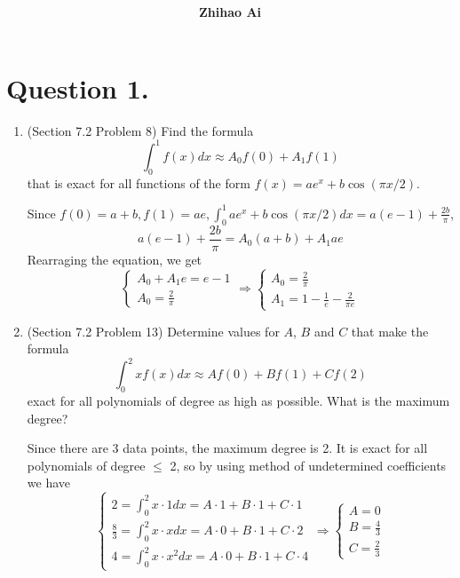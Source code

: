 \documentclass[10pt]{report}
\title{
	\vspace{2in}
	\textmd{\textbf{\hwCourse\\\hwTitle}}\\
	\vspace{0.3in}\large{\textit{\hmwkClassInstructor}}
	\vspace{3in}
}
\author{\textbf{Zhihao Ai}}
\date{}
\newcommand{\dintt}[4] {\int_{#1}^{#2} #3 d#4}
\begin{document}
\maketitle

\section*{Question 1.}
\begin{enumerate}
	\item 
	(Section 7.2 Problem 8) Find the formula
	\[
	\dintt{0}{1}{f(x)}{x} \approx A_0 f(0) + A_1 f(1)
	\]
	that is exact for all functions of the form $f(x)=ae^x+b\cos{(\pi x/2)}$.
	
	Since $f(0) = a+b, f(1) = ae, \dintt{0}{1}{ae^x+b\cos{(\pi x/2)}}{x} = a(e-1)+\frac{2b}{\pi}$,
	\[
	a(e-1)+\frac{2b}{\pi} = A_0 (a+b) + A_1 ae
	\]
	Rearraging the equation, we get
	\[
	\begin{cases}
	A_0 + A_1 e = e - 1\\[1ex]
	A_0 = \frac{2}{\pi}
	\end{cases}
	\Rightarrow
	\begin{cases}
	A_0 = \frac{2}{\pi}\\[1ex]
	A_1 = 1 - \frac{1}{e} - \frac{2}{\pi e}
	\end{cases}
	\]
	
	\item 
	(Section 7.2 Problem 13) Determine values for $A$, $B$ and $C$ that make the formula
	\[
	\dintt{0}{2}{xf(x)}{x} \approx Af(0) + Bf(1) + Cf(2)
	\]
	exact for all polynomials of degree as high as possible. What is the maximum degree?
	
	Since there are 3 data points, the maximum degree is 2. It is exact for all polynomials of degree $\le$ 2, so by using method of undetermined coefficients we have
	\[
	\begin{cases}
	2 = \dintt{0}{2}{x\cdot 1}{x} = A\cdot 1 + B\cdot 1 + C\cdot 1\\[1em]
	\frac{8}{3} = \dintt{0}{2}{x\cdot x}{x} = A\cdot 0 + B\cdot 1 + C\cdot 2\\[1em]
	4 = \dintt{0}{2}{x\cdot x^2}{x} = A\cdot 0 + B\cdot 1 + C\cdot 4
	\end{cases}
	\Rightarrow
	\begin{cases}
	A = 0\\[1em]
	B = \frac{4}{3}\\[1em]
	C = \frac{2}{3}
	\end{cases}
	\]
\end{enumerate}
\end{document}

